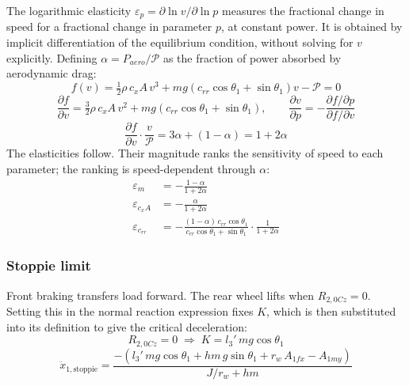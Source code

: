 \documentclass[10pt]{extarticle}
\numberwithin{equation}{subsubsection}
\begin{document}
The logarithmic elasticity $\varepsilon_p = \partial\ln v / \partial\ln p$ measures the fractional change in speed for a fractional change in parameter $p$, at constant power. It is obtained by implicit differentiation of the equilibrium condition, without solving for $v$ explicitly. Defining $\alpha = P_{aero}/\mathcal{P}$ as the fraction of power absorbed by aerodynamic drag:
\begin{equation}
    f(v) = \tfrac{1}{2}\rho\,c_x A\,v^3 + mg\!\left(c_{rr}\cos\theta_1 + \sin\theta_1\right)v - \mathcal{P} = 0
\end{equation}
\begin{equation}
    \frac{\partial f}{\partial v} = \tfrac{3}{2}\rho\,c_x A\,v^2 + mg\!\left(c_{rr}\cos\theta_1+\sin\theta_1\right), \qquad \frac{\partial v}{\partial p} = -\frac{\partial f/\partial p}{\partial f/\partial v}
\end{equation}
\begin{equation}
    \frac{\partial f}{\partial v}\cdot\frac{v}{\mathcal{P}} = 3\alpha + (1-\alpha) = 1 + 2\alpha
\end{equation}
The elasticities follow. Their magnitude ranks the sensitivity of speed to each parameter; the ranking is speed-dependent through $\alpha$:
\begin{align}
    \varepsilon_m         &= -\frac{1-\alpha}{1+2\alpha} \\[4pt]
    \varepsilon_{c_xA}    &= -\frac{\alpha}{1+2\alpha} \\[4pt]
    \varepsilon_{c_{rr}}  &= -\frac{(1-\alpha)\,c_{rr}\cos\theta_1}{c_{rr}\cos\theta_1+\sin\theta_1}\cdot\frac{1}{1+2\alpha}
\end{align}

\subsubsection{Stoppie limit}

Front braking transfers load forward. The rear wheel lifts when $R_{2,0Cz} = 0$. Setting this in the normal reaction expression fixes $K$, which is then substituted into its definition to give the critical deceleration:
\begin{equation}
    R_{2,0Cz} = 0 \;\Rightarrow\; K = l_3'\,mg\cos\theta_1
\end{equation}
\begin{equation}
    \ddot{x}_{1,\text{stoppie}} = \frac{-\left(l_3'\,mg\cos\theta_1 + hm\,g\sin\theta_1 + r_w\,A_{1fx} - A_{1my}\right)}{J/r_w + hm}
\end{equation}
\end{document}
